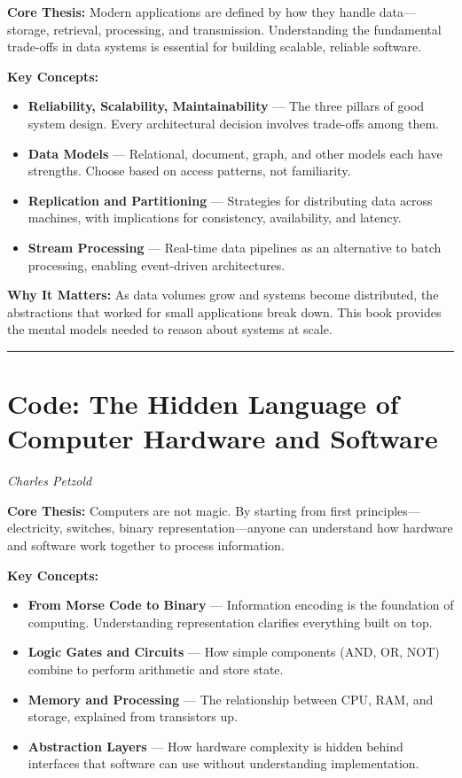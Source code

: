 \documentclass[11pt, letterpaper]{article}
\begin{document}
\textbf{Core Thesis:} Modern applications are defined by how they handle data---storage, retrieval, processing, and transmission. Understanding the fundamental trade-offs in data systems is essential for building scalable, reliable software.

\textbf{Key Concepts:}
\begin{itemize}
    \item \textbf{Reliability, Scalability, Maintainability} --- The three pillars of good system design. Every architectural decision involves trade-offs among them.
    \item \textbf{Data Models} --- Relational, document, graph, and other models each have strengths. Choose based on access patterns, not familiarity.
    \item \textbf{Replication and Partitioning} --- Strategies for distributing data across machines, with implications for consistency, availability, and latency.
    \item \textbf{Stream Processing} --- Real-time data pipelines as an alternative to batch processing, enabling event-driven architectures.
\end{itemize}

\textbf{Why It Matters:} As data volumes grow and systems become distributed, the abstractions that worked for small applications break down. This book provides the mental models needed to reason about systems at scale.

\vspace{1em}

\hrule

\vspace{1em}

\section*{Code: The Hidden Language of Computer Hardware and Software}
\textit{Charles Petzold}

\textbf{Core Thesis:} Computers are not magic. By starting from first principles---electricity, switches, binary representation---anyone can understand how hardware and software work together to process information.

\textbf{Key Concepts:}
\begin{itemize}
    \item \textbf{From Morse Code to Binary} --- Information encoding is the foundation of computing. Understanding representation clarifies everything built on top.
    \item \textbf{Logic Gates and Circuits} --- How simple components (AND, OR, NOT) combine to perform arithmetic and store state.
    \item \textbf{Memory and Processing} --- The relationship between CPU, RAM, and storage, explained from transistors up.
    \item \textbf{Abstraction Layers} --- How hardware complexity is hidden behind interfaces that software can use without understanding implementation.
\end{itemize}
\end{document}
